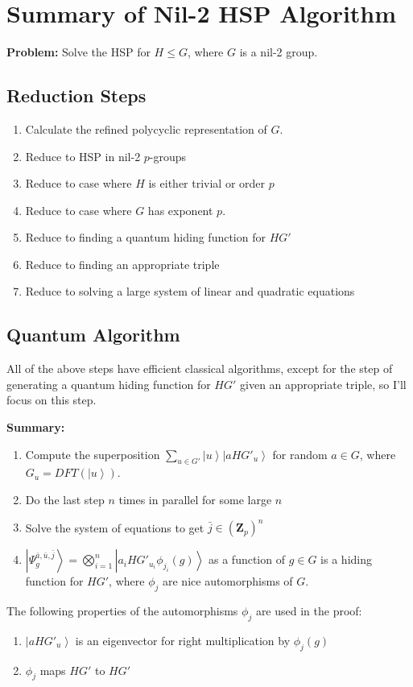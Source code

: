 \documentclass{article}
\newcommand{\ket}[1]{\left| #1 \right\rangle}
\begin{document}

\section{Summary of Nil-2 HSP Algorithm}

\textbf{Problem:} Solve the HSP for $H \leq G$, where $G$ is a nil-2 group.

\subsection{Reduction Steps}

\begin{enumerate}
\item Calculate the refined polycyclic representation of $G$.
\item Reduce to HSP in nil-2 $p$-groups
\item Reduce to case where $H$ is either trivial or order $p$
\item Reduce to case where $G$ has exponent $p$.
\item Reduce to finding a quantum hiding function for  $HG'$
\item Reduce to finding an appropriate triple
\item Reduce to solving a large system of linear and quadratic equations
\end{enumerate}

\subsection{Quantum Algorithm}

All of the above steps have efficient classical algorithms, except for the step of generating a quantum hiding function for $HG'$ given an appropriate triple, so  I'll focus on this step.

\textbf{Summary:}
\begin{enumerate}
\item Compute the superposition $\sum_{u \in G'} \ket{u} \ket{aHG'_u}$ for random $a \in G$, where $G_u = DFT(\ket{u})$.
\item Do the last step $n$ times in parallel for some large $n$
\item Solve the system of equations to get $\bar j \in (\mathbf{Z}_p)^n$
\item $\ket{\Psi_g^{\bar a, \bar u, \bar j}} = \bigotimes_{i=1}^n \ket {a_i H G'_{u_i} \phi_{j_i}(g)}$ as a function of $g \in G$ is a hiding function for $H G'$, where $\phi_j$ are nice automorphisms of $G$.
\end{enumerate}

The following properties of the automorphisms $\phi_j$ are used in the proof:
\begin{enumerate}
\item $\ket{aHG'_u}$ is an eigenvector for right multiplication by $\phi_j(g)$
\item $\phi_j$ maps $HG'$ to $HG'$
\end{enumerate}
\end{document}
